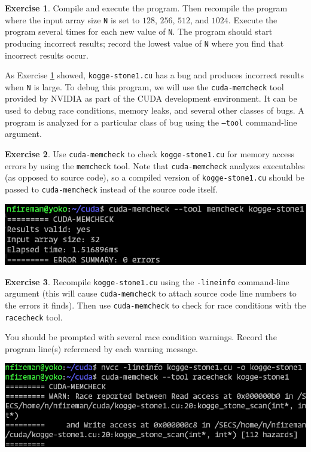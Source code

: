 \documentclass{article}
\theoremstyle{definition}
\newtheorem{exercise}{Exercise}
\begin{document}
\begin{exercise}
\label{exercise/kogge-stone1}
Compile and execute the program. Then recompile the program where the input array size \texttt{N} is set to $128$, $256$, $512$, and $1024$. Execute the program several times for each new value of \texttt{N}. The program should start producing incorrect results; record the lowest value of \texttt{N} where you find that incorrect results occur.
\end{exercise}

As Exercise \ref{exercise/kogge-stone1} showed, \texttt{kogge-stone1.cu} has a bug and produces incorrect results when \texttt{N} is large. To debug this program, we will use the \texttt{cuda-memcheck} tool provided by NVIDIA as part of the CUDA development environment. It can be used to debug race conditions, memory leaks, and several other classes of bugs.
A program is analyzed for a particular class of bug using the \texttt{--tool} command-line argument. 

\begin{exercise}
Use \texttt{cuda-memcheck} to check \texttt{kogge-stone1.cu} for memory access errors by using the \texttt{memcheck} tool. Note that \texttt{cuda-memcheck} analyzes executables (as opposed to source code), so a compiled version of \texttt{kogge-stone1.cu} should be passed to \texttt{cuda-memcheck} instead of the source code itself.

\includegraphics[width=\textwidth]{images/kogge-stone-memcheck.png}
\end{exercise}

\begin{exercise}
Recompile \texttt{kogge-stone1.cu} using the \texttt{-lineinfo} command-line argument (this will cause \texttt{cuda-memcheck} to attach source code line numbers to the errors it finds). Then
use \texttt{cuda-memcheck} to check for race conditions with the \texttt{racecheck} tool. 

You should be prompted with several race condition warnings. Record the program line(s) referenced by each warning message.

\includegraphics[width=\textwidth]{images/kogge-stone-racecheck.png}
\end{exercise}
\end{document}
